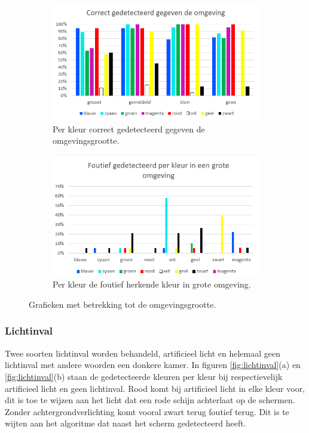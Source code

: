 \begin{figure}
	\begin{subfigure}{0.5\textwidth}
	\centering
	\includegraphics[scale=0.6]{img/Environment}
	\caption{Per kleur correct gedetecteerd gegeven de omgevingsgrootte.}
	\end{subfigure}
	\begin{subfigure}{0.5\textwidth}
	\centering
	\includegraphics[scale=0.6]{img/BigEnvPerColor}
	\caption{Per kleur de foutief herkende kleur in grote omgeving.}
	\end{subfigure}
	\caption{Grafieken met betrekking tot de omgevingsgrootte.}
	\label{fig:omgeving}
\end{figure}

\subsubsection{Lichtinval}
Twee soorten lichtinval worden behandeld, artificieel licht en helemaal geen lichtinval met andere woorden een donkere kamer. In figuren \ref{fig:lichtinval}(a) en \ref{fig:lichtinval}(b) staan de gedetecteerde kleuren per kleur bij respectievelijk artificieel licht en geen lichtinval. Rood komt bij artificieel licht in elke kleur voor, dit is toe te wijzen aan het licht dat een rode schijn achterlaat op de schermen. Zonder achtergrondverlichting  komt vooral zwart terug foutief terug. Dit is te wijten aan het algoritme dat naast het scherm gedetecteerd heeft.

